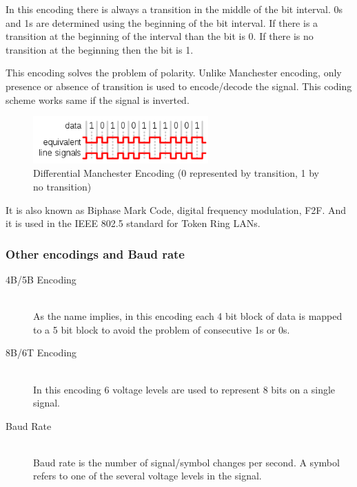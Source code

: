 In this encoding there is always a transition in the middle of the bit interval. 0s and 1s are determined using the beginning of the bit interval. If there is a transition at the beginning of the interval than the bit is 0. If there is no transition at the beginning then the bit is 1.

This encoding solves the problem of polarity. Unlike Manchester encoding, only presence or absence of transition is used to encode/decode the signal. This coding scheme works same if the signal is inverted.

\begin{figure}[H]
    \centering
    \includegraphics[width=0.6\textwidth]{img/DM.png}
    \caption{Differential Manchester Encoding (0 represented by transition, 1 by no transition)}
    \label{fig:DM}
\end{figure}

It is also known as Biphase Mark Code, digital frequency modulation, F2F. And it is used in the IEEE 802.5 standard for Token Ring LANs.

\subsubsection{Other encodings and Baud rate}
\begin{description}
  \item[4B/5B Encoding] \hfill \\ As the name implies, in this encoding each 4 bit block of data is mapped to a 5 bit block to avoid the problem of consecutive 1s or 0s.
  \item[8B/6T Encoding] \hfill \\ In this encoding 6 voltage levels are used to represent 8 bits on a single signal.
  \item[Baud Rate] \hfill \\ Baud rate is the number of signal/symbol changes per second. A symbol refers to one of the several voltage levels in the signal.
\end{description}

